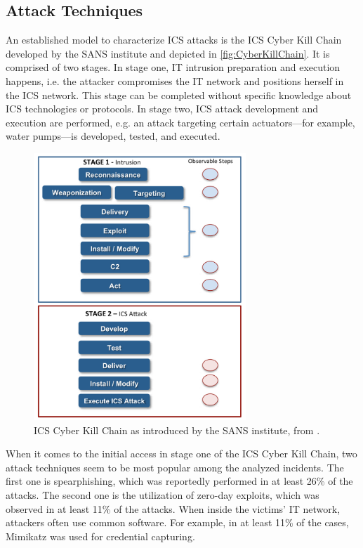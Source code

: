 \documentclass[runningheads]{llncs}
\begin{document}
\subsection{Attack Techniques}
\label{subsection:overview-techniques}
An established model to characterize ICS attacks is the ICS Cyber Kill Chain developed by the SANS institute and depicted in \autoref{fig:CyberKillChain}.
It is comprised of two stages.
In stage one, IT intrusion preparation and execution happens, i.e. the attacker compromises the IT network and positions herself in the ICS network.
This stage can be completed without specific knowledge about ICS technologies or protocols.
In stage two, ICS attack development and execution are performed, e.g. an attack targeting certain actuators---for example, water pumps---is developed, tested, and executed.
\begin{figure}[H]
    \centering
    \includegraphics[width=8cm]{figures/ICSCyberKillChain.png}
    \caption{ICS Cyber Kill Chain as introduced by the SANS institute, from \cite{assante.15}.}
    \label{fig:CyberKillChain}
\end{figure}\noindent
When it comes to the initial access in stage one of the ICS Cyber Kill Chain, two attack techniques seem to be most popular among the analyzed incidents.
The first one is spearphishing, which was reportedly performed in at least 26\% of the attacks.
The second one is the utilization of zero-day exploits, which was observed in at least 11\% of the attacks.
When inside the victims' IT network, attackers often use common software.
For example, in at least 11\% of the cases, Mimikatz was used for credential capturing.
\end{document}
